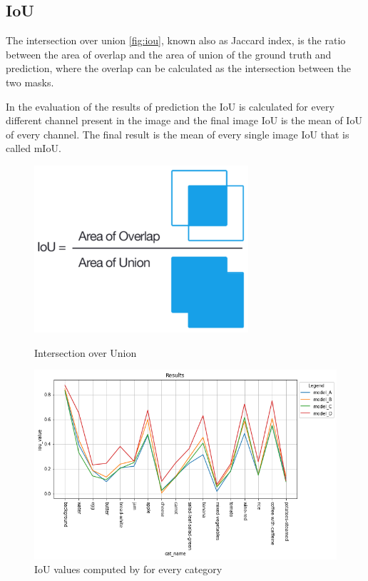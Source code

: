 \documentclass[a4paper,10pt]{report}
\begin{document}
\subsection{IoU}\label{subsec:subsection-511}

The intersection over union \ref{fig:iou}, known also as Jaccard index, is the ratio between the area of overlap and the area of union of the ground truth and prediction, where the overlap can be calculated as the intersection between the two masks.

In the evaluation of the results of prediction the IoU is calculated for every different channel present in the image and the final image IoU is the mean of IoU of every channel.
The final result is the mean of every single image IoU that is called mIoU.


\begin{figure}[h]
  \centering\begin{minipage}[b]{0.37\textwidth}
    \includegraphics[width=\textwidth]{assets/img/IoU.png}
\caption{Intersection over Union}
\label{fig:iou}
  \end{minipage}
  \hfill\begin{minipage}[b]{0.60\textwidth}
    \includegraphics[width=\textwidth]{assets/img/cat_iou.png}
    \caption{IoU values computed by for every category}
\label{fig:cat_iou}
  \end{minipage}
\end{figure}
\end{document}
